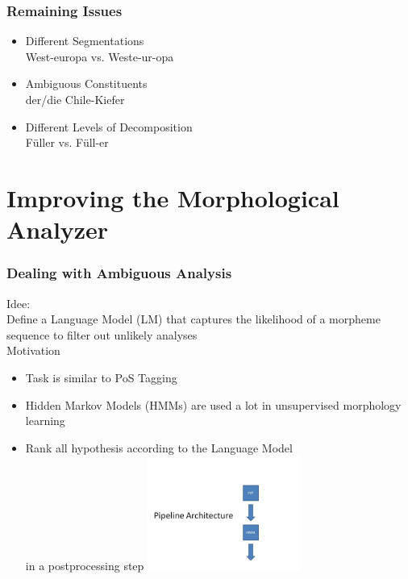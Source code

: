\documentclass {beamer}
\begin{document}
\frame
{  \frametitle{Remaining Issues}  
\begin{itemize}
  \item<1-> Different Segmentations \\
   West-europa vs. Weste-ur-opa 
  \item<2-> Ambiguous Constituents \\
   der/die Chile-Kiefer
     \item<3-> Different Levels of Decomposition \\
     F\"uller vs. F\"ull-er
     \end{itemize}

}

\section{Improving the Morphological Analyzer}

\frame
{  \frametitle{Dealing with Ambiguous Analysis}
Idee:\\
Define a Language Model (LM) that captures the likelihood of a morpheme sequence to filter out unlikely analyses \\
Motivation
 \begin{itemize}
\item Task is similar to PoS Tagging 
\item Hidden Markov Models (HMMs) are used a lot in unsupervised morphology learning
\item Rank all hypothesis according to the Language Model \\
in a postprocessing step
\includegraphics[width=5cm] {Pipeline2.jpg}
\end{itemize}
}
 
\end{document}
